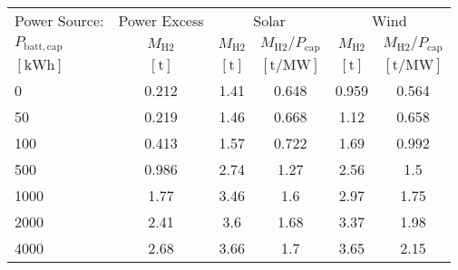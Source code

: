 \begin{table}
\label{tab: VaryBattery}
\begin{tabular}{l|c|cc|cc}
\toprule
Power Source: & Power Excess & \multicolumn{2}{|c}{Solar} & \multicolumn{2}{|c}{Wind} \\
$P_{\mathrm{batt,cap}}$ & $M_{\mathrm{H2}}$ & $M_{\mathrm{H2}}$ & $M_{\mathrm{H2}}/P_{\mathrm{cap}}$ & $M_{\mathrm{H2}}$ & $M_{\mathrm{H2}}/P_{\mathrm{cap}}$ \\
$\left[\mathrm{kWh}\right]$ & $\left[\mathrm{t}\right]$ & $\left[\mathrm{t}\right]$ & $\left[\mathrm{t/MW}\right]$ & $\left[\mathrm{t}\right]$ & $\left[\mathrm{t/MW}\right]$ \\
\midrule
0 & 0.212 & 1.41 & 0.648 & 0.959 & 0.564 \\
50 & 0.219 & 1.46 & 0.668 & 1.12 & 0.658 \\
100 & 0.413 & 1.57 & 0.722 & 1.69 & 0.992 \\
500 & 0.986 & 2.74 & 1.27 & 2.56 & 1.5 \\
1000 & 1.77 & 3.46 & 1.6 & 2.97 & 1.75 \\
2000 & 2.41 & 3.6 & 1.68 & 3.37 & 1.98 \\
4000 & 2.68 & 3.66 & 1.7 & 3.65 & 2.15 \\
\bottomrule
\end{tabular}
\end{table}
